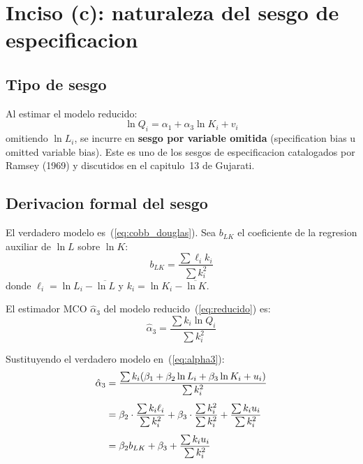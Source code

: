 \documentclass[12pt, letterpaper]{article}
\theoremstyle{remark}
\begin{document}
\section{Inciso (c): naturaleza del sesgo de especificacion}

\subsection{Tipo de sesgo}

Al estimar el modelo reducido:
\begin{equation}
  \ln Q_i = \alpha_1 + \alpha_3 \ln K_i + v_i
  \label{eq:reducido}
\end{equation}
omitiendo $\ln L_i$, se incurre en \textbf{sesgo por variable omitida}
(specification bias u omitted variable bias). Este es uno de los sesgos
de especificacion catalogados por Ramsey (1969) y discutidos en el
capitulo~13 de Gujarati.

\subsection{Derivacion formal del sesgo}

El verdadero modelo es~(\ref{eq:cobb_douglas}). Sea $b_{LK}$ el coeficiente
de la regresion auxiliar de $\ln L$ sobre $\ln K$:
\begin{equation}
  b_{LK} = \frac{\sum \ell_i k_i}{\sum k_i^2}
  \label{eq:b_LK}
\end{equation}
donde $\ell_i = \ln L_i - \overline{\ln L}$ y $k_i = \ln K_i - \overline{\ln K}$.

El estimador MCO $\hat\alpha_3$ del modelo reducido~(\ref{eq:reducido}) es:
\begin{equation}
  \hat\alpha_3 = \frac{\sum k_i \ln Q_i}{\sum k_i^2}
  \label{eq:alpha3}
\end{equation}

Sustituyendo el verdadero modelo en~(\ref{eq:alpha3}):
\begin{align}
  \hat\alpha_3
  &= \frac{\sum k_i (\beta_1 + \beta_2 \ln L_i + \beta_3 \ln K_i + u_i)}
          {\sum k_i^2}
  \notag\\[4pt]
  &= \beta_2 \cdot \frac{\sum k_i \ell_i}{\sum k_i^2}
   + \beta_3 \cdot \frac{\sum k_i^2}{\sum k_i^2}
   + \frac{\sum k_i u_i}{\sum k_i^2}
  \notag\\[4pt]
  &= \beta_2 b_{LK} + \beta_3 + \frac{\sum k_i u_i}{\sum k_i^2}
  \label{eq:alpha3_descomp}
\end{align}
\end{document}
